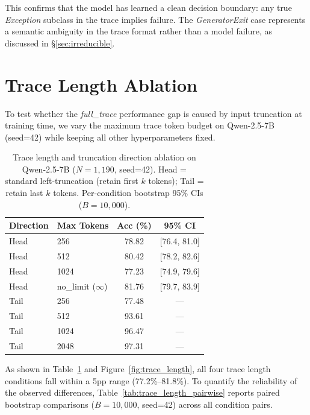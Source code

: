 This confirms that the model has learned a clean decision boundary: any true \textit{Exception} subclass in the trace implies failure.
The \textit{GeneratorExit} case represents a semantic ambiguity in the trace format rather than a model failure, as discussed in \S\ref{sec:irreducible}.

\section{Trace Length Ablation}
\label{sec:trace_length_full}

To test whether the \textit{full\_trace} performance gap is caused by input truncation at training time, we vary the maximum trace token budget on Qwen-2.5-7B (seed=42) while keeping all other hyperparameters fixed.

\begin{table}[h!]
\centering
\caption{Trace length and truncation direction ablation on Qwen-2.5-7B ($N{=}1{,}190$, seed=42). Head = standard left-truncation (retain first $k$ tokens); Tail = retain last $k$ tokens. Per-condition bootstrap 95\% CIs ($B{=}10{,}000$).}
\label{tab:trace_length}
\small
\begin{tabular}{llcc}
\toprule
\textbf{Direction} & \textbf{Max Tokens} & \textbf{Acc (\%)} & \textbf{95\% CI} \\
\midrule
Head & 256  & 78.82 & [76.4, 81.0] \\
Head & 512  & 80.42 & [78.2, 82.6] \\
Head & 1024 & 77.23 & [74.9, 79.6] \\
Head & no\_limit ($\infty$) & 81.76 & [79.7, 83.9] \\
\midrule
Tail & 256  & 77.48 & --- \\
Tail & 512  & 93.61 & --- \\
Tail & 1024 & 96.47 & --- \\
Tail & 2048 & 97.31 & --- \\
\bottomrule
\end{tabular}
\end{table}


As shown in Table~\ref{tab:trace_length} and Figure~\ref{fig:trace_length}, all four trace length conditions fall within a 5pp range (77.2\%--81.8\%).
To quantify the reliability of the observed differences, Table~\ref{tab:trace_length_pairwise} reports paired bootstrap comparisons ($B{=}10{,}000$, seed=42) across all condition pairs.

